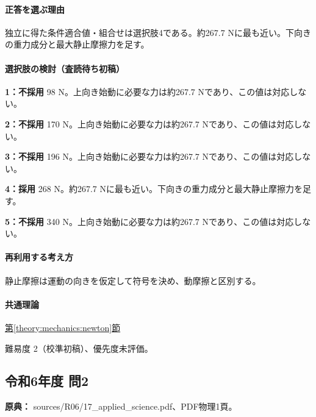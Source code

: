 \paragraph{正答を選ぶ理由} 独立に得た条件適合値・組合せは選択肢4である。約267.7 Nに最も近い。下向きの重力成分と最大静止摩擦力を足す。

\paragraph{選択肢の検討（査読待ち初稿）}\mbox{}\par

\noindent\textbf{1：不採用} 98 N。上向き始動に必要な力は約267.7 Nであり、この値は対応しない。\par

\noindent\textbf{2：不採用} 170 N。上向き始動に必要な力は約267.7 Nであり、この値は対応しない。\par

\noindent\textbf{3：不採用} 196 N。上向き始動に必要な力は約267.7 Nであり、この値は対応しない。\par

\noindent\textbf{4：採用} 268 N。約267.7 Nに最も近い。下向きの重力成分と最大静止摩擦力を足す。\par

\noindent\textbf{5：不採用} 340 N。上向き始動に必要な力は約267.7 Nであり、この値は対応しない。\par

\paragraph{再利用する考え方} 静止摩擦は運動の向きを仮定して符号を決め、動摩擦と区別する。

\paragraph{共通理論} \hyperref[theory:mechanics:newton]{第\ref*{theory:mechanics:newton}節}

\par 難易度 2（校準初稿）、優先度未評価。

\subsection{令和6年度 問2}
\label{q:r06-reg-applied-02}

\noindent\textbf{原典：} sources/R06/17\_applied\_science.pdf、PDF物理1頁。

